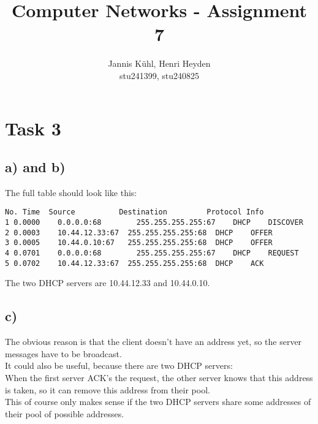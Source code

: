 \documentclass[12pt, a4paper]{article}
\title{Computer Networks - Assignment 7}
\author{Jannis Kühl, Henri Heyden\\ \small stu241399, stu240825}
\date{}
\begin{document}
\maketitle
\section*{Task 3}
\subsection*{a) and b)}
The full table should look like this:
\begin{lstlisting}
No. Time  Source          Destination         Protocol Info
1 0.0000 	0.0.0.0:68	 	  255.255.255.255:67 	DHCP 	DISCOVER
2 0.0003 	10.44.12.33:67	255.255.255.255:68 	DHCP 	OFFER	
3 0.0005 	10.44.0.10:67 	255.255.255.255:68 	DHCP 	OFFER	
4 0.0701 	0.0.0.0:68	 	  255.255.255.255:67	DHCP 	REQUEST	  
5 0.0702 	10.44.12.33:67 	255.255.255.255:68 	DHCP 	ACK		 
\end{lstlisting}
The two DHCP servers are 10.44.12.33 and 10.44.0.10.
\subsection*{c)}
The obvious reason is that the client doesn't have an address yet, so the server messages have to be broadcast. \\
It could also be useful, because there are two DHCP servers:\\
When the first server ACK's the request, the other server knows that this address is taken, so it can remove this address from their pool. \\
This of course only makes sense if the two DHCP servers share some addresses of their pool of possible addresses.
\end{document}
